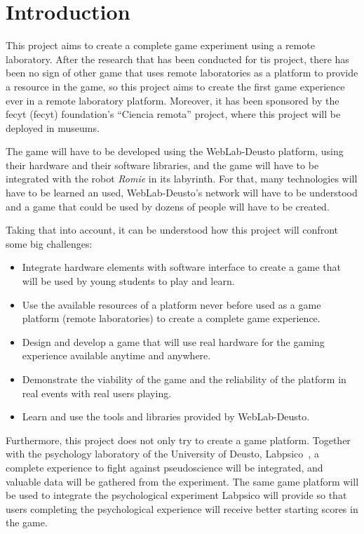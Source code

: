 \chapter{Introduction}

This project aims to create a complete game experiment using a remote laboratory. After the research
that has been conducted for tis project, there has been no sign of other game that uses remote
laboratories as a platform to provide a resource in the game, so this project aims to create the
first game experience ever in a remote laboratory platform. Moreover, it has been sponsored by the
\acrshort{fecyt} (\acrlong{fecyt}) foundation's ``Ciencia remota'' project, where this project will
be deployed in museums.

The game will have to be developed using the WebLab-Deusto platform, using their hardware and their
software libraries, and the game will have to be integrated with the robot \emph{Romie} in its
labyrinth. For that, many technologies will have to be learned an used, WebLab-Deusto's network will
have to be understood and a game that could be used by dozens of people will have to be created.

Taking that into account, it can be understood how this project will confront some big challenges:

\begin{itemize}

	\item Integrate hardware elements with software interface to create a game that will be used by
	young students to play and learn.

	\item Use the available resources of a platform never before used as a game platform (remote
	laboratories) to create a complete game experience.

	\item Design and develop a game that will use real hardware for the gaming experience available
	anytime and anywhere.

	\item Demonstrate the viability of the game and the reliability of the platform in real events
	with real users playing.

	\item Learn and use the tools and libraries provided by WebLab-Deusto.

\end{itemize}

Furthermore, this project does not only try to create a game platform. Together with the psychology
laboratory of the University of Deusto, Labpsico~\cite{labpsico_web}, a complete experience to fight
against pseudoscience will be integrated, and valuable data will be gathered from the experiment.
The same game platform will be used to integrate the psychological experiment Labpsico will provide
so that users completing the psychological experience will receive better starting scores in the
game.

